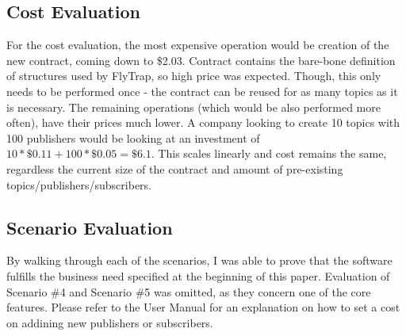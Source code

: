 \subsection{Cost Evaluation}
For the cost evaluation, the most expensive operation would be creation of the new contract, coming down to \$2.03. Contract contains the bare-bone definition of structures used by FlyTrap, so high price was expected. Though, this only needs to be performed once - the contract can be reused for as many topics as it is necessary. The remaining operations (which would be also performed more often), have their prices much lower. A company looking to create 10 topics with 100 publishers would be looking at an investment of $10 * \$0.11 + 100 * \$0.05 = \$6.1$. This scales linearly and cost remains the same, regardless the current size of the contract and amount of pre-existing topics/publishers/subscribers.
\subsection{Scenario Evaluation}
By walking through each of the scenarios, I was able to prove that the software fulfills the business need specified at the beginning of this paper. Evaluation of Scenario \#4 and Scenario \#5 was omitted, as they concern one of the core features. Please refer to the User Manual for an explanation on how to set a cost on addining new publishers or subscribers.

